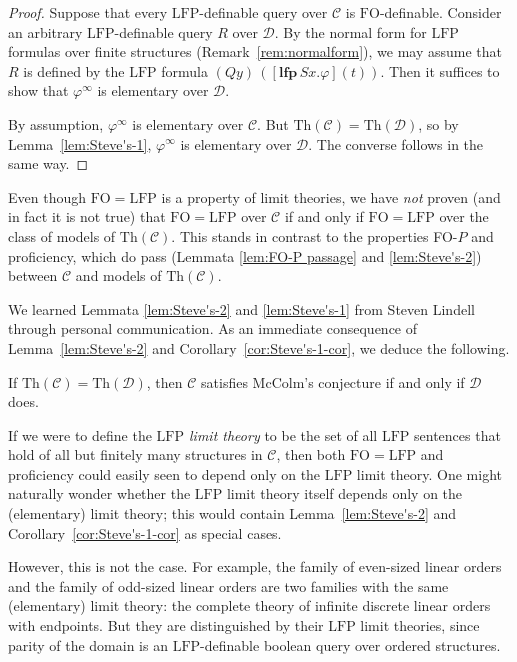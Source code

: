 \documentclass{lmcs}
\newcommand{\Th}{\mathrm{Th}}
\newcommand{\LFP}{\mathrm{LFP}}
\newcommand{\FO}{\mathrm{FO}}
\theoremstyle{thmC}
\begin{document}
\begin{proof}
Suppose that every $\LFP$-definable query over $\mathcal{C}$ is $\FO$-definable. Consider an arbitrary $\LFP$-definable query $R$ over $\mathcal{D}$. By the normal form for $\LFP$ formulas over finite structures (Remark~\ref{rem:normalform}), we may assume that $R$ is defined by the $\LFP$ formula $(Qy)\,([\mathbf{lfp}\,Sx.\varphi](t))$. Then it suffices to show that $\varphi^\infty$ is elementary over $\mathcal{D}$.

By assumption, $\varphi^\infty$ is elementary over $\mathcal{C}$. But $\Th(\mathcal{C}) = \Th(\mathcal{D})$, so by Lemma~\ref{lem:Steve's-1}, $\varphi^\infty$ is elementary over $\mathcal{D}$. The converse follows in the same way. 
\end{proof}

\begin{rem}
Even though $\FO = \LFP$ is a property of limit theories, we have \emph{not} proven (and in fact it is not true) that  $\FO = \LFP$ over $\mathcal{C}$ if and only if $\FO = \LFP$ over the class of models of $\Th(\mathcal{C})$. This stands in contrast to the properties FO-$P$ and proficiency, which do pass (Lemmata \ref{lem:FO-P passage} and \ref{lem:Steve's-2}) between $\mathcal{C}$ and models of $\mathrm{Th}(\mathcal{C})$.
\end{rem}

We learned Lemmata  \ref{lem:Steve's-2} and \ref{lem:Steve's-1} from Steven Lindell through personal communication. As an immediate consequence of Lemma~\ref{lem:Steve's-2} and Corollary~\ref{cor:Steve's-1-cor},  we deduce the following.

\begin{cor}
If $\Th(\mathcal{C}) = \Th(\mathcal{D})$, then  $\mathcal{C}$ satisfies McColm's conjecture if and only if $\mathcal{D}$ does.
\end{cor}

\begin{rem}
If we were to define the \emph{$\LFP$ limit theory} to be the set of all $\LFP$ sentences that hold of all but finitely many structures in $\mathcal{C}$, then both $\FO = \LFP$ and proficiency could easily seen to depend only on the $\LFP$ limit theory. One might naturally wonder whether the $\LFP$ limit theory itself depends only on the (elementary) limit theory; this would contain Lemma~\ref{lem:Steve's-2} and Corollary~\ref{cor:Steve's-1-cor} as special cases.

However, this is not the case. For example, the family of even-sized linear orders and the family of odd-sized linear orders are two families with the same (elementary) limit theory: the complete theory of infinite discrete linear orders with endpoints. But they are distinguished by their $\LFP$ limit theories, since parity of the domain is an $\LFP$-definable boolean query over ordered structures. 
\end{rem}
\end{document}
